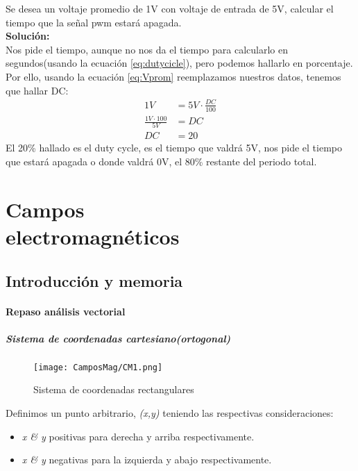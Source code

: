 \documentclass[11pt,fleqn]{book} %
\begin{document}
\begin{exercise}
Se desea un voltaje promedio de 1V con voltaje de entrada de 5V, calcular el tiempo que la señal pwm estará apagada.\\
\textbf{Solución:}\\
Nos pide el tiempo, aunque no nos da el tiempo para calcularlo en segundos(usando la ecuación \ref{eq:dutycicle}), pero podemos hallarlo en porcentaje. Por ello, usando la ecuación \ref{eq:Vprom} reemplazamos nuestros datos, tenemos que hallar DC:
\begin{equation}
\begin{split}
1V&=5V\cdot\frac{DC}{100}\\
\frac{1V\cdot 100}{5V}&=DC\\
DC&=20
\end{split}
\end{equation}
El 20\% hallado es el duty cycle, es el tiempo que valdrá 5V, nos pide el tiempo que estará apagada o donde valdrá 0V, el 80\% restante del periodo total.
\end{exercise}











\part{Campos \\electromagnéticos}
\chapter{Introducción y memoria}
\subsection{Repaso análisis vectorial}
\subsubsection{Sistema de coordenadas cartesiano(ortogonal)}
\begin{wrapfigure}{r}{0.4\linewidth}
\centering\texttt{[image: CamposMag/CM1.png]}
\caption{Sistema de coordenadas rectangulares}
\label{fig:coordenadas rectangulares}
\end{wrapfigure}
Definimos un punto arbitrario, \textit{(x,y)} teniendo las respectivas consideraciones:
\begin{itemize}
\item \textit{x \& y} positivas para derecha y arriba respectivamente.
\item \textit{x \& y} negativas para la izquierda y abajo respectivamente.
\end{itemize}
\end{document}
